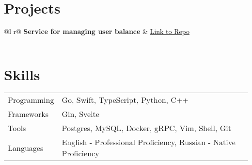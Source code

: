 \documentclass[a4paper,12pt]{article}
\begin{document}
\section{Projects}

\begin{tabularx}{\linewidth}{ @{}l r@{} }
\textbf{Service for managing user balance} & \hfill \href{https://github.com/dupreehkuda/transaction-service}{Link to Repo} \\[3.75pt]
  \\
\end{tabularx}



\section{Skills}
\begin{tabularx}{\linewidth}{@{}l X@{}}
Programming &  \normalsize{Go, Swift, TypeScript, Python, C++}\\
Frameworks &  \normalsize{Gin, Svelte}\\
Tools &  \normalsize{Postgres, MySQL, Docker, gRPC, Vim, Shell, Git}\\
Languages &  \normalsize{English - Professional Proficiency, Russian - Native Proficiency}\\  
\end{tabularx}

\vfill
\center{\footnotesize \today}
\end{document}
